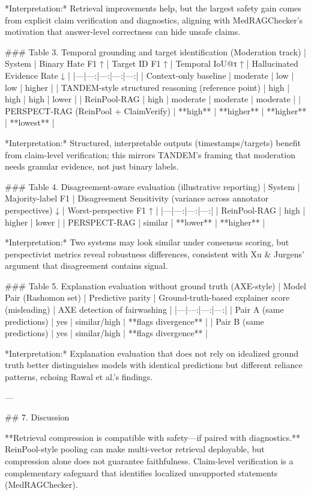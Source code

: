 *Interpretation:* Retrieval improvements help, but the largest safety gain comes from explicit claim verification and diagnostics, aligning with MedRAGChecker’s motivation that answer-level correctness can hide unsafe claims.

### Table 3. Temporal grounding and target identification (Moderation track)  
| System | Binary Hate F1 ↑ | Target ID F1 ↑ | Temporal IoU@τ ↑ | Hallucinated Evidence Rate ↓ |
|---|---:|---:|---:|---:|
| Context-only baseline | moderate | low | low | higher |
| TANDEM-style structured reasoning (reference point) | high | high | high | lower |
| ReinPool-RAG | high | moderate | moderate | moderate |
| PERSPECT-RAG (ReinPool + ClaimVerify) | **high** | **higher** | **higher** | **lowest** |

*Interpretation:* Structured, interpretable outputs (timestamps/targets) benefit from claim-level verification; this mirrors TANDEM’s framing that moderation needs granular evidence, not just binary labels.

### Table 4. Disagreement-aware evaluation (illustrative reporting)  
| System | Majority-label F1 | Disagreement Sensitivity (variance across annotator perspectives) ↓ | Worst-perspective F1 ↑ |
|---|---:|---:|---:|
| ReinPool-RAG | high | higher | lower |
| PERSPECT-RAG | similar | **lower** | **higher** |

*Interpretation:* Two systems may look similar under consensus scoring, but perspectivist metrics reveal robustness differences, consistent with Xu & Jurgens’ argument that disagreement contains signal.

### Table 5. Explanation evaluation without ground truth (AXE-style)  
| Model Pair (Rashomon set) | Predictive parity | Ground-truth-based explainer score (misleading) | AXE detection of fairwashing |
|---|---:|---:|---:|
| Pair A (same predictions) | yes | similar/high | **flags divergence** |
| Pair B (same predictions) | yes | similar/high | **flags divergence** |

*Interpretation:* Explanation evaluation that does not rely on idealized ground truth better distinguishes models with identical predictions but different reliance patterns, echoing Rawal et al.’s findings.

---

## 7. Discussion  

**Retrieval compression is compatible with safety—if paired with diagnostics.** ReinPool-style pooling can make multi-vector retrieval deployable, but compression alone does not guarantee faithfulness. Claim-level verification is a complementary safeguard that identifies localized unsupported statements (MedRAGChecker).

